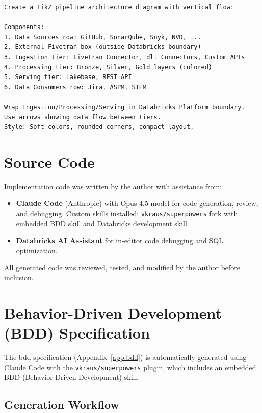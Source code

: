 \begin{lstlisting}[frame=single, backgroundcolor=\color{backcolour}, rulecolor=\color{framecolour}, basicstyle=\small\ttfamily, breaklines=true]
Create a TikZ pipeline architecture diagram with vertical flow:

Components:
1. Data Sources row: GitHub, SonarQube, Snyk, NVD, ...
2. External Fivetran box (outside Databricks boundary)
3. Ingestion tier: Fivetran Connector, dlt Connectors, Custom APIs
4. Processing tier: Bronze, Silver, Gold layers (colored)
5. Serving tier: Lakebase, REST API
6. Data Consumers row: Jira, ASPM, SIEM

Wrap Ingestion/Processing/Serving in Databricks Platform boundary.
Use arrows showing data flow between tiers.
Style: Soft colors, rounded corners, compact layout.
\end{lstlisting}

\section{Source Code}

Implementation code was written by the author with assistance from:

\begin{itemize}
    \item \textbf{Claude Code} (Anthropic) with Opus 4.5 model for code generation, review, and debugging. Custom skills installed: \texttt{vkraus/superpowers} fork with embedded BDD skill and Databricks development skill.
    \item \textbf{Databricks AI Assistant} for in-editor code debugging and SQL optimization.
\end{itemize}

All generated code was reviewed, tested, and modified by the author before inclusion.

\section{Behavior-Driven Development (BDD) Specification}

The \gls{bdd} specification (Appendix~\ref{app:bdd}) is automatically generated using Claude Code with the \texttt{vkraus/superpowers} plugin, which includes an embedded BDD (Behavior-Driven Development) skill.

\subsection*{Generation Workflow}

